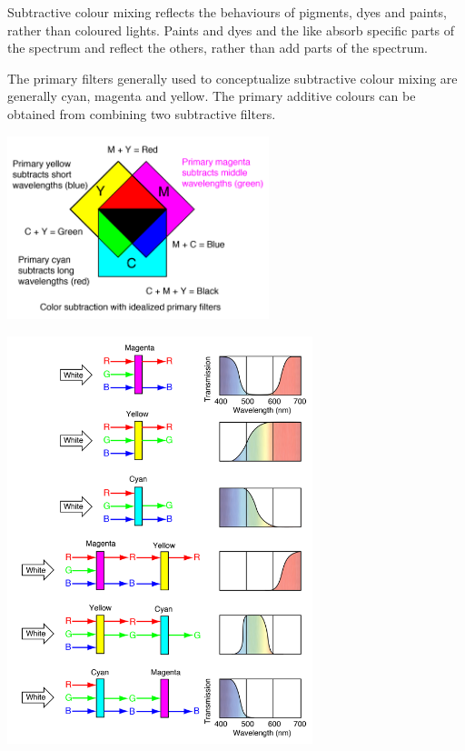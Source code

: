 \documentclass[12pt]{article}
\begin{document}
\begin{multicols}{2}

Subtractive colour mixing reflects the behaviours of pigments, dyes and paints, rather than coloured lights.
Paints and dyes and the like absorb specific parts of the spectrum and reflect the others, rather than add parts of the spectrum.

The primary filters generally used to conceptualize subtractive colour mixing are generally cyan, magenta and yellow.
The primary additive colours can be obtained from combining two subtractive filters.

\includegraphics[width=3in]{subtractive_colour_mixing}

\columnbreak

\includegraphics[width=3.5in]{subtractive_filters}

\end{multicols}

\newpage
\end{document}

